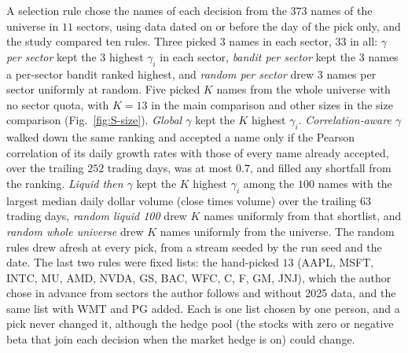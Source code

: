 A selection rule chose the names of each decision from the $373$ names of the universe in $11$ sectors, using data
dated on or before the day of the pick only, and the study compared ten rules. Three picked $3$ names in each sector,
$33$ in all: \emph{$\gamma$ per sector} kept the $3$ highest $\gamma_i$ in each sector, \emph{bandit per sector} kept
the $3$ names a per-sector bandit ranked highest, and \emph{random per sector} drew $3$ names per sector uniformly at
random. Five picked $K$ names from the whole universe with no sector quota, with $K = 13$ in the main comparison and
other sizes in the size comparison (Fig.~\ref{fig:S-size}). \emph{Global $\gamma$} kept the $K$ highest $\gamma_i$.
\emph{Correlation-aware $\gamma$} walked down the same ranking and accepted a name only if the Pearson correlation of
its daily growth rates with those of every name already accepted, over the trailing $252$ trading days, was at most
$0.7$, and filled any shortfall from the ranking. \emph{Liquid then $\gamma$} kept the $K$ highest $\gamma_i$ among
the $100$ names with the largest median daily dollar volume (close times volume) over the trailing $63$ trading days,
\emph{random liquid 100} drew $K$ names uniformly from that shortlist, and \emph{random whole universe} drew $K$ names
uniformly from the universe. The random rules drew afresh at every pick, from a stream seeded by the run seed and the
date. The last two rules were fixed lists: the hand-picked $13$ (AAPL, MSFT, INTC, MU, AMD, NVDA, GS, BAC, WFC, C, F,
GM, JNJ), which the author chose in advance from sectors the author follows and without 2025 data, and the same list
with WMT and PG added. Each is one list chosen by one person, and a pick never changed it, although the hedge pool
(the stocks with zero or negative beta that join each decision when the market hedge is on) could change.

